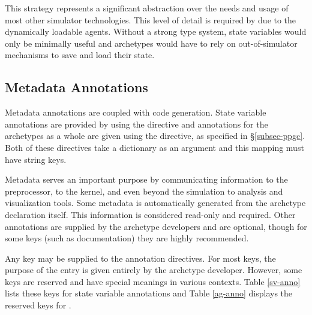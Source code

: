 This strategy represents a significant abstraction over the needs and usage of most 
other simulator technologies. This level of detail is required by \cyclus due to the
dynamically loadable agents. Without a strong type system, state variables 
would only be minimally useful and archetypes would have to rely on out-of-simulator
mechanisms to save and load their state.

\subsection{Metadata Annotations}

Metadata annotations are coupled with code generation.  State variable annotations
are provided by using the  directive and annotations for 
the archetypes as a whole are given using the  directive,
as specified in \S \ref{subsec-ppgc}. Both of these directives take a dictionary 
as an argument and this mapping must have string keys.

Metadata serves an important purpose by communicating information to the \cyclus
preprocessor, to the \cyclus kernel, and even beyond the simulation to analysis 
and visualization tools. Some metadata is automatically generated from the 
archetype declaration itself.  This information is considered read-only and required. 
Other annotations are supplied by the archetype developers and are optional, 
though for some keys (such as documentation) they are highly recommended.

Any key may be supplied to the annotation directives. For most keys, the 
purpose of the entry is given entirely by the archetype developer. However, 
some keys are reserved and have special meanings in various contexts. Table
\ref{sv-anno} lists these keys for state variable annotations and Table
\ref{ag-anno} displays the reserved keys for .

